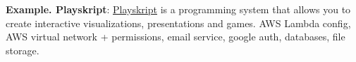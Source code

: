 

\textbf{Example. Playskript}: \href{https://code.playskript.com/}{Playskript} is a programming system that allows you to create interactive visualizations, presentations and games. AWS Lambda config, AWS virtual network + permissions, email service, google auth, databases, file storage. 









